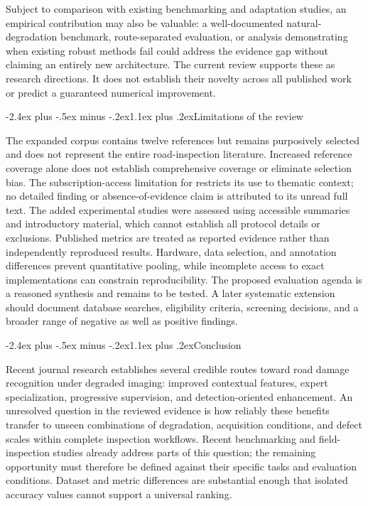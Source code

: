 \documentclass[11pt,a4paper]{article}
\makeatletter
\renewcommand\section{\@startsection{section}{1}{\z@}%
  {-2.4ex plus -.5ex minus -.2ex}{1.1ex plus .2ex}{\normalfont\large\bfseries}}
\makeatother
\begin{document}
Subject to comparison with existing benchmarking and adaptation studies, an empirical contribution may also be valuable: a well-documented natural-degradation benchmark, route-separated evaluation, or analysis demonstrating when existing robust methods fail could address the evidence gap without claiming an entirely new architecture. The current review supports these as research directions. It does not establish their novelty across all published work or predict a guaranteed numerical improvement.

\section{Limitations of the review}

The expanded corpus contains twelve references but remains purposively selected and does not represent the entire road-inspection literature. Increased reference coverage alone does not establish comprehensive coverage or eliminate selection bias. The subscription-access limitation for \cite{r2} restricts its use to thematic context; no detailed finding or absence-of-evidence claim is attributed to its unread full text. The added experimental studies were assessed using accessible summaries and introductory material, which cannot establish all protocol details or exclusions. Published metrics are treated as reported evidence rather than independently reproduced results. Hardware, data selection, and annotation differences prevent quantitative pooling, while incomplete access to exact implementations can constrain reproducibility. The proposed evaluation agenda is a reasoned synthesis and remains to be tested. A later systematic extension should document database searches, eligibility criteria, screening decisions, and a broader range of negative as well as positive findings.

\section{Conclusion}

Recent journal research establishes several credible routes toward road damage recognition under degraded imaging: improved contextual features, expert specialization, progressive supervision, and detection-oriented enhancement. An unresolved question in the reviewed evidence is how reliably these benefits transfer to unseen combinations of degradation, acquisition conditions, and defect scales within complete inspection workflows. Recent benchmarking and field-inspection studies already address parts of this question; the remaining opportunity must therefore be defined against their specific tasks and evaluation conditions. Dataset and metric differences are substantial enough that isolated accuracy values cannot support a universal ranking.
\end{document}
